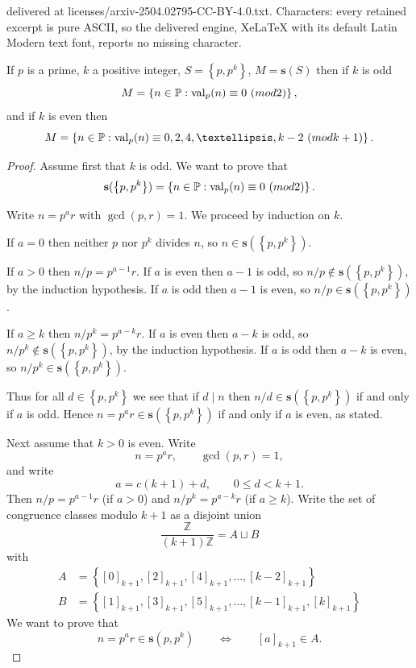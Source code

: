 \documentclass[10pt,a4paper]{amsart}
\newcommand\setsuchas[2]{\left\{{#1}:{#2}\right\}}
\newcommand{\NNp}{{\mathbb{P}}}
\newcommand{\ZZ}{{\mathbb{Z}}}
\newcommand{\divides}[2]{#1 \mid #2}
\newcommand{\modd}[2]{#1\ \textup{(mod }#2\textup{)}}
\newcommand{\set}[1]{\left\{{#1}\right\}}
\newcommand{\ssift}[1]{\mathbf{s}({#1})}
\newcommand{\val}{\operatorname{val}}
\begin{document}
delivered at licenses/arxiv-2504.02795-CC-BY-4.0.txt. Characters: every retained excerpt is pure ASCII, so the delivered engine, XeLaTeX with its default Latin Modern text font, reports no missing character.
\begin{theorem}
If \(p\) is a prime, \(k\) a positive integer, \(S=\set{p,p^{k}}\), \(M=\ssift{S}\) then if \(k\) is odd
\[M = \setsuchas{n \in \NNp}{\val_{p}(n) \equiv \modd{0}{2}},\]
and if \(k\) is even then
\[M = \setsuchas{n \in \NNp}{\val_{p}(n) \equiv \modd{0,2,4, \dots, k-2}{k+1}}.\]
\label{org2dba548}
\end{theorem}

\begin{proof}
Assume first that \(k\) is odd.
We want to prove that
\[\ssift{\set{p,p^{k}}} = \setsuchas{n \in \NNp}{\val_{p}(n) \equiv \modd{0}{2}}.\]

Write \(n=p^{a}r\) with \(\gcd(p,r)=1\). We proceed by induction on \(k\).

If \(a=0\) then neither \(p\) nor \(p^{k}\) divides \(n\), so \(n \in \ssift{\set{p,p^{k}}}\).

If \(a>0\) then \(n/p=p^{a-1}r\).
If \(a\) is even then \(a-1\) is odd,
so \(n/p \not \in \ssift{\set{p,p^{k}}}\), by the induction hypothesis.
If \(a\) is odd then \(a-1\) is even,
so \(n/p \in \ssift{\set{p,p^{k}}}\).

If \(a \ge k\) then \(n/p^{k}=p^{a-k}r\).
If \(a\) is even then \(a-k\) is odd,
so \(n/p^{k} \not \in \ssift{\set{p,p^{k}}}\), by the induction hypothesis.
If \(a\) is odd then \(a-k\) is even,
so \(n/p^{k} \in \ssift{\set{p,p^{k}}}\).

Thus for all \(d \in \set{p,p^{k}}\) we see that if \(\divides{d}{n}\) then
\(n/d \in \ssift{\set{p,p^{k}}}\) if and only if \(a\) is odd. Hence
\(n=p^{a}r \in \ssift{\set{p,p^{k}}}\) if and only if \(a\) is even, as stated.

Next assume that \(k>0\) is even. Write
\[n=p^{a}r, \qquad \gcd(p,r)=1,\]
and write
\[a= c(k+1) + d,  \qquad 0 \le d < k+1.\]
Then \(n/p = p^{a-1}r\) (if \(a>0\)) and \(n/p^{k} = p^{a-k}r\) (if \(a \ge k\)).
Write the set of congruence classes modulo \(k+1\) as a disjoint union
\begin{displaymath}
\frac{\ZZ}{(k+1)\ZZ}  = A \sqcup B
\end{displaymath}
with
\begin{align*}
A & =  \set{[0]_{k+1}, [2]_{k+1}, [4]_{k+1}, \dots, [k-2]_{{k+1}}} \\
B &=  \set{[1]_{k+1}, [3]_{k+1}, [5]_{k+1}, \dots, [k-1]_{k+1}, [k]_{k+1}}
\end{align*}
We want to prove that
\[n=p^{a}r \in \ssift{p,p^{k}} \qquad \iff \qquad [a]_{k+1} \in A.\]


\end{proof}
\end{document}
